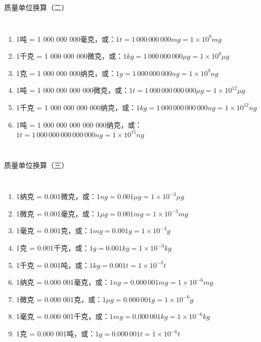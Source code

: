 \documentclass[aspectratio=169]{ctexbeamer} %
\begin{document}
\begin{frame}[t]{质量单位换算（二）}
\begin{columns}
\begin{enumerate}[label={\Alph*.}]
\item 1吨 = 1 000 000 000毫克，或：$1 t = 1 \, 000 \, 000 \, 000 mg = 1 \times 10^{9} mg$ 
\item 1千克 = 1 000 000 000微克，或：$1 kg = 1 \, 000 \, 000 \, 000 \mu g = 1 \times 10^{9} \mu g$ 
\item 1克 = 1 000 000 000纳克，或：$1 g = 1 \, 000 \, 000 \, 000 ng = 1 \times 10^{9} ng$ 
\item 1吨 = 1 000 000 000 000微克，或：$1 t = 1 \, 000 \, 000 \, 000 \, 000 \mu g = 1 \times 10^{12} \mu g$ 
\item 1千克 = 1 000 000 000 000纳克，或：$1 kg = 1 \, 000 \, 000 \, 000 \, 000 ng = 1 \times 10^{12} ng$ 
\item 1吨 = 1 000 000 000 000 000纳克，或：$1 t = 1 \, 000 \, 000 \, 000 \, 000 \, 000 ng = 1 \times 10^{15} ng$ 

\end{enumerate}
\end{columns}
\end{frame}

\begin{frame}[t]{质量单位换算（三）}
\begin{columns}
\begin{enumerate}[label={\Alph*.}]
\item 1纳克 = 0.001微克，或：$1 ng = 0.001 \mu g = 1 \times 10^{-3} \mu g$ 
\item 1微克 = 0.001毫克，或：$1 \mu g = 0.001 mg = 1 \times 10^{-3} mg$ 
\item 1毫克 = 0.001克，或：$1 mg = 0.001 g = 1 \times 10^{-3} g$ 
\item 1克 = 0.001千克，或：$1 g = 0.001 kg = 1 \times 10^{-3} kg$ 
\item 1千克 = 0.001吨，或：$1 kg = 0.001 t = 1 \times 10^{-3} t$ 
\item 1纳克 = 0.000 001毫克，或：$1 ng = 0.000 \, 001 mg = 1 \times 10^{-6} mg$ 
\item 1微克 = 0.000 001克，或：$1 \mu g = 0.000 \, 001 g = 1 \times 10^{-6} g$ 
\item 1毫克 = 0.000 001千克，或：$1 mg = 0.000 \, 001 kg = 1 \times 10^{-6} kg$ 
\item 1克 = 0.000 001吨，或：$1 g = 0.000 \, 001 t = 1 \times 10^{-6} t$ 

\end{enumerate}
\end{columns}
\end{frame}
\end{document}
